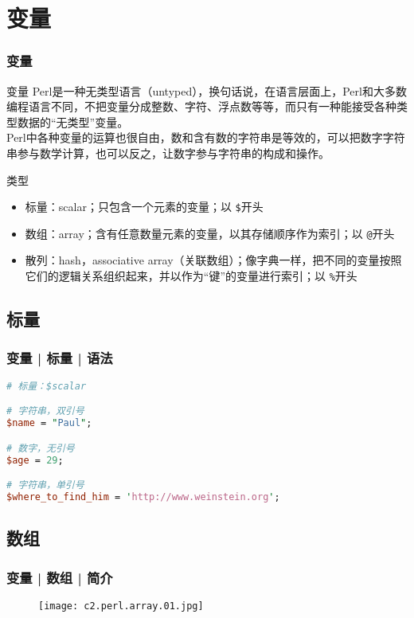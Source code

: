 \section{变量}
\begin{frame}[fragile]
  \frametitle{变量}
  \begin{block}{变量}
    Perl是一种无类型语言（untyped），换句话说，在语言层面上，Perl和大多数编程语言不同，不把变量分成整数、字符、浮点数等等，而只有一种能接受各种类型数据的“无类型”变量。\\
    Perl中各种变量的运算也很自由，数和含有数的字符串是等效的，可以把数字字符串参与数学计算，也可以反之，让数字参与字符串的构成和操作。
  \end{block}
  \pause
  \begin{block}{\alert{类型}}
    \begin{itemize}
      \item 标量：scalar；只包含一个元素的变量；以 \verb|$|开头
      \item 数组：array；含有任意数量元素的变量，以其存储顺序作为索引；以 \verb|@|开头
      \item 散列：hash，associative array（关联数组）；像字典一样，把不同的变量按照它们的逻辑关系组织起来，并以作为“键”的变量进行索引；以 \verb|%|开头
    \end{itemize}
  \end{block}
\end{frame}

\subsection{标量}
\begin{frame}[fragile]
  \frametitle{变量 | 标量 | \alert{语法}}
\begin{lstlisting}[language=Perl]
# 标量：$scalar

# 字符串，双引号
$name = "Paul";

# 数字，无引号
$age = 29;

# 字符串，单引号
$where_to_find_him = 'http://www.weinstein.org';
\end{lstlisting}
\end{frame}

\subsection{数组}
\begin{frame}
  \frametitle{变量 | 数组 | 简介}
  \begin{figure}
    \centering
    \texttt{[image: c2.perl.array.01.jpg]}
  \end{figure}
\end{frame}

